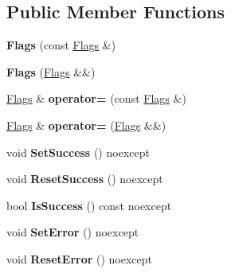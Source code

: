 \subsection*{Public Member Functions}
\begin{DoxyCompactItemize}
\item 
\hypertarget{structae_1_1error_1_1_flags_a20c944aed64eceeec6e4eb34553f499e}{}\label{structae_1_1error_1_1_flags_a20c944aed64eceeec6e4eb34553f499e} 
{\bfseries Flags} (const \hyperlink{structae_1_1error_1_1_flags}{Flags} \&)
\item 
\hypertarget{structae_1_1error_1_1_flags_a02aa5d86c37d9f80a4de795fb81b1c19}{}\label{structae_1_1error_1_1_flags_a02aa5d86c37d9f80a4de795fb81b1c19} 
{\bfseries Flags} (\hyperlink{structae_1_1error_1_1_flags}{Flags} \&\&)
\item 
\hypertarget{structae_1_1error_1_1_flags_a0a215694736b3b865b639c5b5abd173c}{}\label{structae_1_1error_1_1_flags_a0a215694736b3b865b639c5b5abd173c} 
\hyperlink{structae_1_1error_1_1_flags}{Flags} \& {\bfseries operator=} (const \hyperlink{structae_1_1error_1_1_flags}{Flags} \&)
\item 
\hypertarget{structae_1_1error_1_1_flags_ae08dbfd93ce5d40516fc3b27fb82d196}{}\label{structae_1_1error_1_1_flags_ae08dbfd93ce5d40516fc3b27fb82d196} 
\hyperlink{structae_1_1error_1_1_flags}{Flags} \& {\bfseries operator=} (\hyperlink{structae_1_1error_1_1_flags}{Flags} \&\&)
\item 
\hypertarget{structae_1_1error_1_1_flags_adbb5b192eaf777f86ca7ba817579d06b}{}\label{structae_1_1error_1_1_flags_adbb5b192eaf777f86ca7ba817579d06b} 
void {\bfseries Set\+Success} () noexcept
\item 
\hypertarget{structae_1_1error_1_1_flags_a71313318889dccdaf15ab4956afefbaf}{}\label{structae_1_1error_1_1_flags_a71313318889dccdaf15ab4956afefbaf} 
void {\bfseries Reset\+Success} () noexcept
\item 
\hypertarget{structae_1_1error_1_1_flags_a7c28232700cf13cef02bb0ba4c6db15b}{}\label{structae_1_1error_1_1_flags_a7c28232700cf13cef02bb0ba4c6db15b} 
bool {\bfseries Is\+Success} () const noexcept
\item 
\hypertarget{structae_1_1error_1_1_flags_a0564df5fa77cd2ef1dd7dcb0ce4105b9}{}\label{structae_1_1error_1_1_flags_a0564df5fa77cd2ef1dd7dcb0ce4105b9} 
void {\bfseries Set\+Error} () noexcept
\item 
\hypertarget{structae_1_1error_1_1_flags_a9b13f39f7bbead91006bc776d32cb14e}{}\label{structae_1_1error_1_1_flags_a9b13f39f7bbead91006bc776d32cb14e} 
void {\bfseries Reset\+Error} () noexcept

\end{DoxyCompactItemize}
